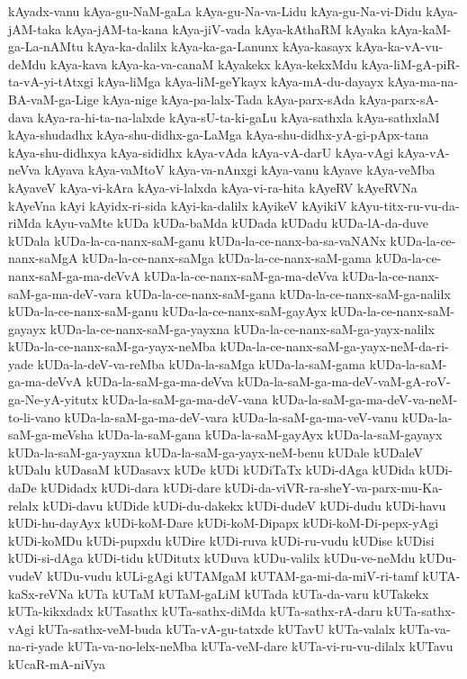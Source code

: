 {kAyadx-vanu
kAya-gu-NaM-gaLa
kAya-gu-Na-va-Lidu
kAya-gu-Na-vi-Didu
kAya-jAM-taka
kAya-jAM-ta-kana
kAya-jiV-vada
kAya-kAthaRM
kAyaka
kAya-kaM-ga-La-nAMtu
kAya-ka-dalilx
kAya-ka-ga-Lanunx
kAya-kasayx
kAya-ka-vA-vu-deMdu
kAya-kava
kAya-ka-va-canaM
kAyakekx
kAya-kekxMdu
kAya-liM-gA-piR-ta-vA-yi-tAtxgi
kAya-liMga
kAya-liM-geYkayx
kAya-mA-du-dayayx
kAya-ma-na-BA-vaM-ga-Lige
kAya-nige
kAya-pa-lalx-Tada
kAya-parx-sAda
kAya-parx-sA-dava
kAya-ra-hi-ta-na-lalxde
kAya-sU-ta-ki-gaLu
kAya-sathxla
kAya-sathxlaM
kAya-shudadhx
kAya-shu-didhx-ga-LaMga
kAya-shu-didhx-yA-gi-pApx-tana
kAya-shu-didhxya
kAya-sididhx
kAya-vAda
kAya-vA-darU
kAya-vAgi
kAya-vA-neVva
kAyava
kAya-vaMtoV
kAya-va-nAnxgi
kAya-vanu
kAyave
kAya-veMba
kAyaveV
kAya-vi-kAra
kAya-vi-lalxda
kAya-vi-ra-hita
kAyeRV
kAyeRVNa
kAyeVna
kAyi
kAyidx-ri-sida
kAyi-ka-dalilx
kAyikeV
kAyikiV
kAyu-titx-ru-vu-da-riMda
kAyu-vaMte
kUDa
kUDa-baMda
kUDada
kUDadu
kUDa-lA-da-duve
kUDala
kUDa-la-ca-nanx-saM-ganu
kUDa-la-ce-nanx-ba-sa-vaNANx
kUDa-la-ce-nanx-saMgA
kUDa-la-ce-nanx-saMga
kUDa-la-ce-nanx-saM-gama
kUDa-la-ce-nanx-saM-ga-ma-deVvA
kUDa-la-ce-nanx-saM-ga-ma-deVva
kUDa-la-ce-nanx-saM-ga-ma-deV-vara
kUDa-la-ce-nanx-saM-gana
kUDa-la-ce-nanx-saM-ga-nalilx
kUDa-la-ce-nanx-saM-ganu
kUDa-la-ce-nanx-saM-gayAyx
kUDa-la-ce-nanx-saM-gayayx
kUDa-la-ce-nanx-saM-ga-yayxna
kUDa-la-ce-nanx-saM-ga-yayx-nalilx
kUDa-la-ce-nanx-saM-ga-yayx-neMba
kUDa-la-ce-nanx-saM-ga-yayx-neM-da-ri-yade
kUDa-la-deV-va-reMba
kUDa-la-saMga
kUDa-la-saM-gama
kUDa-la-saM-ga-ma-deVvA
kUDa-la-saM-ga-ma-deVva
kUDa-la-saM-ga-ma-deV-vaM-gA-roV-ga-Ne-yA-yitutx
kUDa-la-saM-ga-ma-deV-vana
kUDa-la-saM-ga-ma-deV-va-neM-to-li-vano
kUDa-la-saM-ga-ma-deV-vara
kUDa-la-saM-ga-ma-veV-vanu
kUDa-la-saM-ga-meVsha
kUDa-la-saM-gana
kUDa-la-saM-gayAyx
kUDa-la-saM-gayayx
kUDa-la-saM-ga-yayxna
kUDa-la-saM-ga-yayx-neM-benu
kUDale
kUDaleV
kUDalu
kUDasaM
kUDasavx
kUDe
kUDi
kUDiTaTx
kUDi-dAga
kUDida
kUDi-daDe
kUDidadx
kUDi-dara
kUDi-dare
kUDi-da-viVR-ra-sheY-va-parx-mu-Ka-relalx
kUDi-davu
kUDide
kUDi-du-dakekx
kUDi-dudeV
kUDi-dudu
kUDi-havu
kUDi-hu-dayAyx
kUDi-koM-Dare
kUDi-koM-Dipapx
kUDi-koM-Di-pepx-yAgi
kUDi-koMDu
kUDi-pupxdu
kUDire
kUDi-ruva
kUDi-ru-vudu
kUDise
kUDisi
kUDi-si-dAga
kUDi-tidu
kUDitutx
kUDuva
kUDu-valilx
kUDu-ve-neMdu
kUDu-vudeV
kUDu-vudu
kULi-gAgi
kUTAMgaM
kUTAM-ga-mi-da-miV-ri-tamf
kUTA-kaSx-reVNa
kUTa
kUTaM
kUTaM-gaLiM
kUTada
kUTa-da-varu
kUTakekx
kUTa-kikxdadx
kUTasathx
kUTa-sathx-diMda
kUTa-sathx-rA-daru
kUTa-sathx-vAgi
kUTa-sathx-veM-buda
kUTa-vA-gu-tatxde
kUTavU
kUTa-valalx
kUTa-va-na-ri-yade
kUTa-va-no-lelx-neMba
kUTa-veM-dare
kUTa-vi-ru-vu-dilalx
kUTavu
kUcaR-mA-niVya
}
